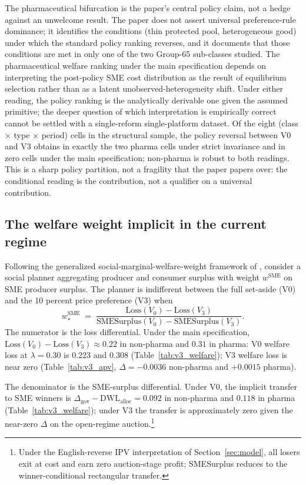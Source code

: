 The pharmaceutical bifurcation is the paper's central policy claim, not a hedge against an unwelcome result. The paper does not assert universal preference-rule dominance; it identifies the conditions (thin protected pool, heterogeneous good) under which the standard policy ranking reverses, and it documents that those conditions are met in only one of the two Group-65 sub-classes studied. The pharmaceutical welfare ranking under the main specification depends on interpreting the post-policy SME cost distribution as the result of equilibrium selection rather than as a latent unobserved-heterogeneity shift. Under either reading, the policy ranking is the analytically derivable one given the assumed primitive; the deeper question of which interpretation is empirically correct cannot be settled with a single-reform single-platform dataset. Of the eight (class $\times$ type $\times$ period) cells in the structural sample, the policy reversal between V0 and V3 obtains in exactly the two pharma cells under strict invariance and in zero cells under the main specification; non-pharma is robust to both readings. This is a sharp policy partition, not a fragility that the paper papers over: the conditional reading is the contribution, not a qualifier on a universal contribution.

\subsection{The welfare weight implicit in the current regime}

Following the generalized social-marginal-welfare-weight framework of \citet{saezstantcheva2016}, consider a social planner aggregating producer and consumer surplus with weight $w^{\text{SME}}$ on SME producer surplus. The planner is indifferent between the full set-aside (V0) and the 10 percent price preference (V3) when
\begin{equation}\label{eq:welfare_weight}
w^{\text{SME}}_\star
\;=\; \frac{\mathrm{Loss}(V_0) - \mathrm{Loss}(V_3)}
           {\mathrm{SMESurplus}(V_0) - \mathrm{SMESurplus}(V_3)}.
\end{equation}
The numerator is the loss differential. Under the main specification, $\mathrm{Loss}(V_0) - \mathrm{Loss}(V_3) \approx 0.22$ in non-pharma and $0.31$ in pharma: V0 welfare loss at $\lambda = 0.30$ is $0.223$ and $0.308$ (Table~\ref{tab:v3_welfare}); V3 welfare loss is near zero (Table~\ref{tab:v3_apv}, $\Delta = -0.0036$ non-pharma and $+0.0015$ pharma).

The denominator is the SME-surplus differential. Under V0, the implicit transfer to SME winners is $\Delta_{\text{gov}} - \mathrm{DWL}_{\text{alloc}} = 0.092$ in non-pharma and $0.118$ in pharma (Table~\ref{tab:v3_welfare}); under V3 the transfer is approximately zero given the near-zero $\Delta$ on the open-regime auction.\footnote{Under the English-reverse IPV interpretation of Section~\ref{sec:model}, all losers exit at cost and earn zero auction-stage profit; SMESurplus reduces to the winner-conditional rectangular transfer.}

